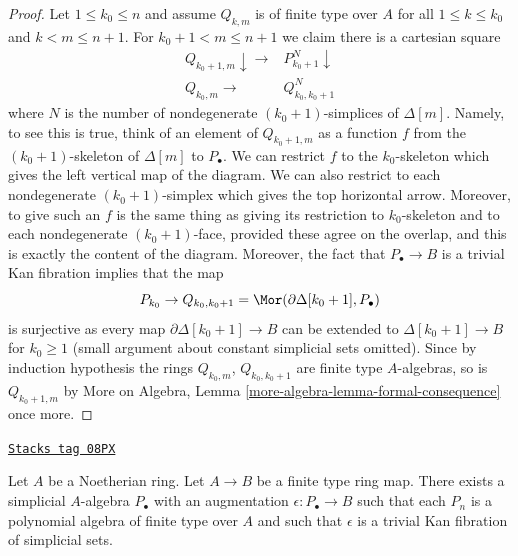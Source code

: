 \begin{proof}
\medskip\noindent
Let $1 \leq k_0 \leq n$ and assume $Q_{k, m}$ is of finite type
over $A$ for all $1 \leq k \leq k_0$ and $k < m \leq n + 1$.
For $k_0 + 1 < m \leq n + 1$ we claim there is a cartesian square
$$
\begin{array}{cc}Q_{k_0 + 1, m} \downarrow\longrightarrow & P_{k_0 + 1}^N \downarrow \\ Q_{k_0, m} \longrightarrow & Q_{k_0, k_0 + 1}^N\end{array}
$$
where $N$ is the number of nondegenerate $(k_0 + 1)$-simplices
of $\Delta[m]$. Namely, to see this is true, think of an element of
$Q_{k_0 + 1, m}$ as a function $f$ from the $(k_0 + 1)$-skeleton
of $\Delta[m]$ to $P_\bullet$. We can restrict $f$ to the $k_0$-skeleton
which gives the left vertical map of the diagram. We can also restrict
to each nondegenerate $(k_0 + 1)$-simplex which gives the top horizontal
arrow. Moreover, to give such an $f$ is the same thing as giving its
restriction to $k_0$-skeleton and to each nondegenerate
$(k_0 + 1)$-face, provided these agree on the overlap, and this
is exactly the content of the diagram. Moreover, the fact that
$P_\bullet \to B$ is a trivial Kan fibration implies that
the map
$$
P_{k_0} \to Q_{k_0, k_0 + 1} = \Mor(\partial \Delta[k_0 + 1], P_\bullet)
$$
is surjective as every map $\partial \Delta[k_0 + 1] \to B$ can be extended
to $\Delta[k_0 + 1] \to B$ for $k_0 \geq 1$ (small argument about constant
simplicial sets omitted). Since by induction hypothesis the rings
$Q_{k_0, m}$, $Q_{k_0, k_0 + 1}$ are finite type $A$-algebras, so is
$Q_{k_0 + 1, m}$ by
More on Algebra, Lemma \ref{more-algebra-lemma-formal-consequence}
once more.
\end{proof}

\begin{proposition}[Polynomial]
\label{cotangent-proposition-polynomial}
\href{https://stacks.math.columbia.edu/tag/08PX}{\texttt{Stacks tag 08PX}}

Let $A$ be a Noetherian ring. Let $A \to B$ be a finite type ring map.
There exists a simplicial $A$-algebra $P_\bullet$ with an augmentation
$\epsilon : P_\bullet \to B$ such that each $P_n$ is a polynomial algebra
of finite type over $A$ and such that $\epsilon$ is a trivial
Kan fibration of simplicial sets.
\end{proposition}

